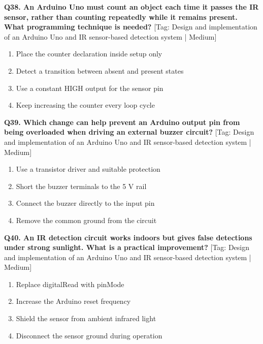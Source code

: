 \noindent\textbf{Q38. An Arduino Uno must count an object each time it passes the IR sensor, rather than counting repeatedly while it remains present. What programming technique is needed?} \hfill [Tag: Design and implementation of an Arduino Uno and IR sensor-based detection system | Medium]
\begin{enumerate}[label=(\alph*),topsep=2pt,itemsep=1pt,partopsep=0pt,parsep=0pt]
    \item {Place the counter declaration inside setup only}
    \item {Detect a transition between absent and present states}
    \item {Use a constant HIGH output for the sensor pin}
    \item {Keep increasing the counter every loop cycle}
\end{enumerate}
\vspace{2mm}

\noindent\textbf{Q39. Which change can help prevent an Arduino output pin from being overloaded when driving an external buzzer circuit?} \hfill [Tag: Design and implementation of an Arduino Uno and IR sensor-based detection system | Medium]
\begin{enumerate}[label=(\alph*),topsep=2pt,itemsep=1pt,partopsep=0pt,parsep=0pt]
    \item {Use a transistor driver and suitable protection}
    \item {Short the buzzer terminals to the 5 V rail}
    \item {Connect the buzzer directly to the input pin}
    \item {Remove the common ground from the circuit}
\end{enumerate}
\vspace{2mm}

\noindent\textbf{Q40. An IR detection circuit works indoors but gives false detections under strong sunlight. What is a practical improvement?} \hfill [Tag: Design and implementation of an Arduino Uno and IR sensor-based detection system | Medium]
\begin{enumerate}[label=(\alph*),topsep=2pt,itemsep=1pt,partopsep=0pt,parsep=0pt]
    \item {Replace digitalRead with pinMode}
    \item {Increase the Arduino reset frequency}
    \item {Shield the sensor from ambient infrared light}
    \item {Disconnect the sensor ground during operation}
\end{enumerate}
\vspace{2mm}

